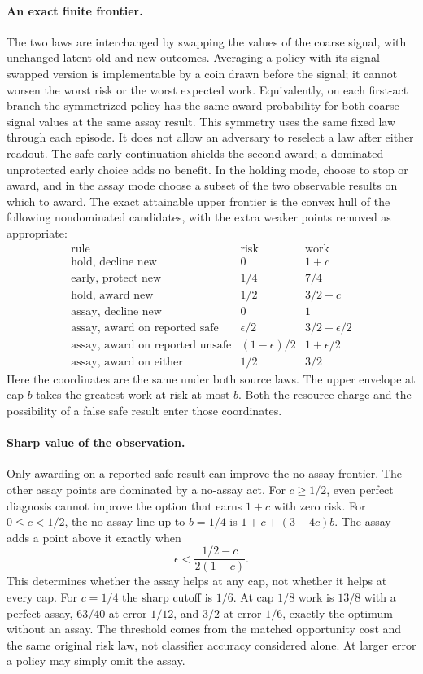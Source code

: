 \documentclass[11pt]{article}
\begin{document}
\paragraph{An exact finite frontier.}
The two laws are interchanged by swapping the values of the coarse signal, with unchanged latent old and new outcomes. Averaging a policy with its signal-swapped version is implementable by a coin drawn before the signal; it cannot worsen the worst risk or the worst expected work. Equivalently, on each first-act branch the symmetrized policy has the same award probability for both coarse-signal values at the same assay result. This symmetry uses the same fixed law through each episode. It does not allow an adversary to reselect a law after either readout. The safe early continuation shields the second award; a dominated unprotected early choice adds no benefit. In the holding mode, choose to stop or award, and in the assay mode choose a subset of the two observable results on which to award. The exact attainable upper frontier is the convex hull of the following nondominated candidates, with the extra weaker points removed as appropriate:
\[
\begin{array}{r|ll}
\text{rule}&\text{risk}&\text{work}\\\hline
\text{hold, decline new} &0&1+c\\
\text{early, protect new}&1/4&7/4\\
\text{hold, award new}&1/2&3/2+c\\
\text{assay, decline new}&0&1\\
\text{assay, award on reported safe}&\epsilon/2&3/2-\epsilon/2\\
\text{assay, award on reported unsafe}&(1-\epsilon)/2&1+\epsilon/2\\
\text{assay, award on either}&1/2&3/2
\end{array}
\]
Here the coordinates are the same under both source laws. The upper envelope at cap $b$ takes the greatest work at risk at most $b$. Both the resource charge and the possibility of a false safe result enter those coordinates.

\paragraph{Sharp value of the observation.}
Only awarding on a reported safe result can improve the no-assay frontier. The other assay points are dominated by a no-assay act. For $c\geq1/2$, even perfect diagnosis cannot improve the option that earns $1+c$ with zero risk. For $0\leq c<1/2$, the no-assay line up to $b=1/4$ is $1+c+(3-4c)b$. The assay adds a point above it exactly when
\[
 \epsilon<\frac{1/2-c}{2(1-c)}.
\]
This determines whether the assay helps at any cap, not whether it helps at every cap. For $c=1/4$ the sharp cutoff is $1/6$. At cap $1/8$ work is $13/8$ with a perfect assay, $63/40$ at error $1/12$, and $3/2$ at error $1/6$, exactly the optimum without an assay. The threshold comes from the matched opportunity cost and the same original risk law, not classifier accuracy considered alone. At larger error a policy may simply omit the assay.
\end{document}
